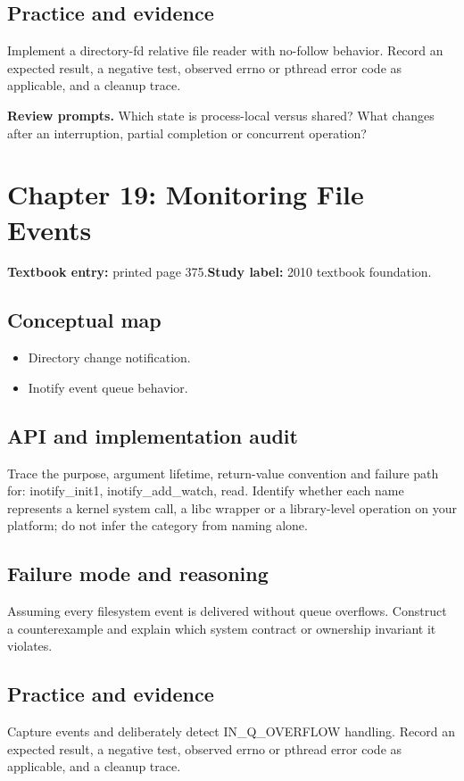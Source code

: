 \documentclass[11pt,letterpaper,oneside]{report}
\begin{document}
\subsection{Practice and evidence}
Implement a directory-fd relative file reader with no-follow behavior. Record an expected result, a negative test, observed errno or pthread error code as applicable, and a cleanup trace.

\textbf{Review prompts.} Which state is process-local versus shared? What changes after an interruption, partial completion or concurrent operation?

\section{Chapter 19: Monitoring File Events}
\textbf{Textbook entry:} printed page 375.\quad \textbf{Study label:} 2010 textbook foundation.

\subsection{Conceptual map}
\begin{itemize}
\item Directory change notification.
\item Inotify event queue behavior.
\end{itemize}
\subsection{API and implementation audit}
Trace the purpose, argument lifetime, return-value convention and failure path for: inotify\_init1, inotify\_add\_watch, read. Identify whether each name represents a kernel system call, a libc wrapper or a library-level operation on your platform; do not infer the category from naming alone.

\subsection{Failure mode and reasoning}
Assuming every filesystem event is delivered without queue overflows. Construct a counterexample and explain which system contract or ownership invariant it violates.

\subsection{Practice and evidence}
Capture events and deliberately detect IN\_Q\_OVERFLOW handling. Record an expected result, a negative test, observed errno or pthread error code as applicable, and a cleanup trace.
\end{document}
